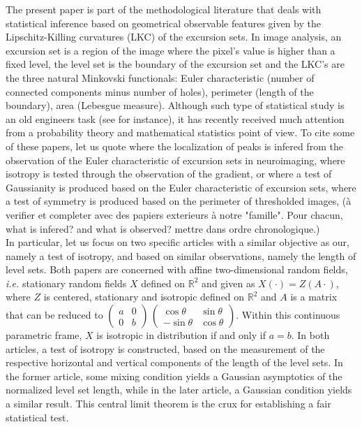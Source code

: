 \documentclass[12pt]{article}
\theoremstyle{Theorem}
\theoremstyle{definition}
\begin{document}
The present paper is part of the methodological literature that deals with statistical inference based on geometrical observable features given by the Lipschitz-Killing curvatures (LKC) of the excursion sets. In image analysis, an excursion set is a region of the image where the pixel's value is higher than a fixed level, the level set is the boundary of the excursion set and the LKC's are the three natural Minkovski functionals: Euler characteristic (number of connected components minus number of holes), perimeter (length of the boundary), area (Lebesgue measure). Although such type of statistical study is an old engineers task (see \cite{Longuet-Higgins} for instance), it has recently received much attention from a probability theory and mathematical statistics point of view.  To cite some of these papers, let us quote \cite{Worsley96} where the localization of peaks is infered from the observation of the Euler characteristic of excursion sets in neuroimaging, \cite{Molina} where isotropy is tested through the observation of the gradient, \cite{DEL17} or \cite{bierme2019} where a test of Gaussianity is produced based on the Euler characteristic of excursion sets, \cite{Psymetrie} where a test of symmetry is produced based on the perimeter of thresholded images,  ({\sc \`a verifier et completer avec des papiers exterieurs \`a notre "famille". Pour chacun, what is infered? and what is observed? mettre dans ordre chronologique.})\\
In particular, let us focus on two specific articles \cite{cabana1987affine, Berzin} with a similar objective as our, namely a test of isotropy, and based on similar observations, namely the length of level sets. Both papers are concerned with affine two-dimensional random fields, \emph{i.e.} stationary random fields $X$ defined on $\mathbb{R}^2$ and given as $X(\cdot)=Z(A\cdot)$, where $Z$ is centered, stationary and isotropic defined on $\mathbb{R}^2$ and $A$ is a matrix that can be reduced to $\begin{pmatrix} a&0\\0&b\end{pmatrix} \,\begin{pmatrix} \cos \theta & \sin \theta \\ -\sin \theta & \cos \theta\end{pmatrix}$. Within this continuous parametric frame, $X$ is isotropic in distribution if and only if $a=b$. In both articles, a test of isotropy is constructed, based on the measurement of the respective horizontal and vertical components of the length of the level sets. In the former article, some mixing condition yields a Gaussian asymptotics of the normalized level set length, while in the later article, a Gaussian condition  yields a similar result. This central limit theorem is the crux for establishing a fair statistical test.
\end{document}
